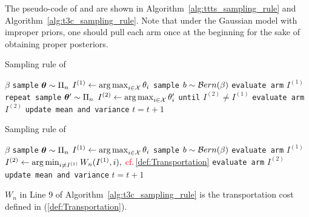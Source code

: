 The pseudo-code of \TTTS and \TCC are shown in Algorithm~\ref{alg:ttts_sampling_rule} and Algorithm~\ref{alg:t3c_sampling_rule}. Note that under the Gaussian model with improper priors, one should pull each arm once at the beginning for the sake of obtaining proper posteriors.

\begin{algorithm}[ht]
\centering
\caption{Sampling rule of \TTTS}
\label{alg:ttts_sampling_rule}
\footnotesize
\begin{algorithmic}[1]
    $\beta$ %
        \State \texttt{sample} ${\boldsymbol \theta} \sim \Pi_n$
        \State $I^{(1)} \leftarrow \operatorname*{arg\,max}_{i\in\mathcal{X}}\theta_i$
	    \State \texttt{sample} $b \sim \mathcal{B} ern(\beta)$
	        \State \texttt{evaluate arm} $I^{(1)}$
	    \Else
	        \State \texttt{repeat sample} ${\boldsymbol \theta}' \sim \Pi_n$
            \State $I^{(2)} \leftarrow \operatorname*{arg\,max}_{i\in\mathcal{X}}\theta_i'$
	        \State \texttt{until} $I^{(2)} \neq I^{(1)}$
		    \State \texttt{evaluate arm} $I^{(2)}$
	    \EndIf
	    \State \texttt{update mean and variance}
	    \State $t = t+1$
   \EndFor
\end{algorithmic}
\end{algorithm}

\begin{algorithm}[ht]
\centering
\caption{Sampling rule of \textcolor{red}{\TCC}}
\label{alg:t3c_sampling_rule}
\footnotesize
\begin{algorithmic}[1]
    $\beta$ %
        \State \texttt{sample} ${\boldsymbol \theta} \sim \Pi_n$
        \State $I^{(1)} \leftarrow \operatorname*{arg\,max}_{i\in\mathcal{X}}\theta_i$
	    \State \texttt{sample} $b \sim \mathcal{B} ern(\beta)$
	        \State \texttt{evaluate arm} $I^{(1)}$
	    \Else
	        \State \textcolor{red}{$I^{(2)} \leftarrow \operatorname*{arg\,min}_{i\neq I^{(1)}}W_n(I^{(1)},i), $ cf.\,\eqref{def:Transportation}}
		    \State \texttt{evaluate arm} $I^{(2)}$
	    \EndIf
	    \State \texttt{update mean and variance}
	    \State $t = t+1$
   \EndFor
\end{algorithmic}
\end{algorithm}

$W_n$ in Line 9 of Algorithm~\ref{alg:t3c_sampling_rule} is the transportation cost defined in (\ref{def:Transportation}).

